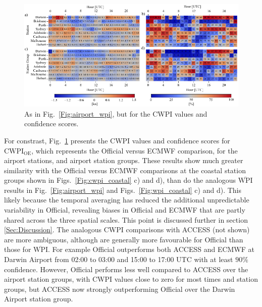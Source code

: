 \documentclass{ametsoc}
\begin{document}
\begin{figure}
\centering
\includegraphics[width=39pc]{airport_cwpi.pdf}
\caption{As in Fig.~\ref{Fig:airport_wpi}, but for the CWPI values and confidence scores.}
\label{Fig:airport_cwpi}
\end{figure}

For constrast, Fig.~\ref{Fig:airport_cwpi} presents the CWPI values and confidence scores for $\text{CWPI}_\text{OE}$, which represents the Official versus ECMWF comparison, for the airport stations, and airport station groups. These results show much greater similarity with the Official versus ECMWF comparisons at the coastal station groups shown in Figs.~\ref{Fig:cwpi_coastal} c) and d), than do the analogous $\overline{\text{WPI}}$ results in Fig.~\ref{Fig:airport_wpi} and Figs.~\ref{Fig:wpi_coastal} c) and d). This likely because the temporal averaging has reduced the additional unpredictable variability in Official, revealing biases in Official and ECMWF that are partly shared across the three spatial scales. This point is discussed further in section \ref{Sec:Discussion}. The analogous CWPI comparisons with ACCESS (not shown) are more ambiguous, although are generally more favourable for Official than those for $\overline{\text{WPI}}$. For example Official outperforms both ACCESS and ECMWF at Darwin Airport from 02:00 to 03:00 and 15:00 to 17:00 UTC with at least $90\%$ confidence. However, Official performs less well compared to ACCESS over the airport station groups, with CWPI values close to zero for most times and station groups, but ACCESS now strongly outperforming Official over the Darwin Airport station group.  
\end{document}
